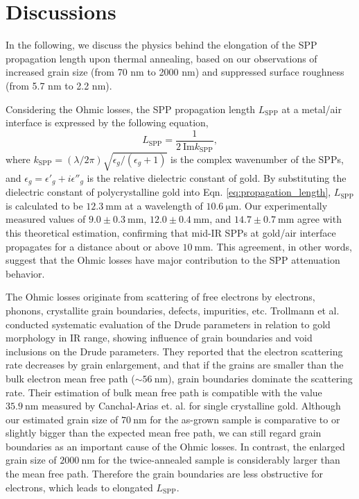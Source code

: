 \documentclass[aip,apl,reprint]{revtex4-1}
\begin{document}
\section{Discussions}
\label{sec:discussion}
In the following, we discuss the physics behind the elongation of the SPP propagation length upon thermal annealing, based on our observations of increased grain size (from 70 nm to 2000 nm) and suppressed surface roughness (from 5.7 nm to 2.2 nm). 

Considering the Ohmic losses, the SPP propagation length $L_{\mathrm{SPP}}$ at a metal/air interface is expressed by the following equation,
\begin{equation}
 L_{\mathrm{SPP}} = \frac{1}{2\:\mathrm{Im} k_{\mathrm{SPP}}},
\label{eq:propagation_length}
 \end{equation}
where $k_{\mathrm{SPP}}=(\lambda/2\pi)\sqrt{\epsilon_g/(\epsilon_g+1)}$ is the complex wavenumber of the SPPs, and $\epsilon_g=\epsilon'_g+i\epsilon''_g$ is the relative dielectric constant of gold. 
By substituting the dielectric constant of polycrystalline gold\cite{Palik} into Eqn. \ref{eq:propagation_length}, $L_{\mathrm{SPP}}$ is calculated to be $12.3\:\mathrm{mm}$ at a wavelength of $10.6\:\mathrm{\mu m}$.
Our experimentally measured values of $9.0\pm0.3\:\mathrm{mm}$, $12.0\pm0.4\:\mathrm{mm}$, and $14.7\pm0.7\:\mathrm{mm}$ agree with this theoretical estimation, confirming that mid-IR SPPs at gold/air interface propagates for a distance about or above $10\:\mathrm{mm}$. 
This agreement, in other words, suggest that the Ohmic losses have major contribution to the SPP attenuation behavior.

The Ohmic losses originate from scattering of free electrons by electrons, phonons, crystallite grain boundaries, defects, impurities\cite{Yang}, etc. Trollmann et al.\cite{Trollmann} conducted systematic evaluation of the Drude parameters in relation to gold morphology in IR range, showing influence of grain boundaries and void inclusions on the Drude parameters. 
They reported that the electron scattering rate decreases by grain enlargement, and that if the grains are smaller than the bulk electron mean free path ($\sim 56\:\mathrm{nm}$), grain boundaries dominate the scattering rate. 
Their estimation of bulk mean free path is compatible with the value $35.9\:\mathrm{nm}$ measured by Canchal-Arias et. al.\cite{Canchal-Arias} for single crystalline gold. Although our estimated grain size of $70\:\mathrm{nm}$ for the as-grown sample is comparative to or slightly bigger than the expected mean free path, we can still regard grain boundaries as an important cause of the Ohmic losses. In contrast, the enlarged grain size of $2000\:\mathrm{nm}$ for the twice-annealed sample is considerably larger than the mean free path. Therefore the grain boundaries are less obstructive for electrons, which leads to elongated $L_{\mathrm{SPP}}$. 
\end{document}
